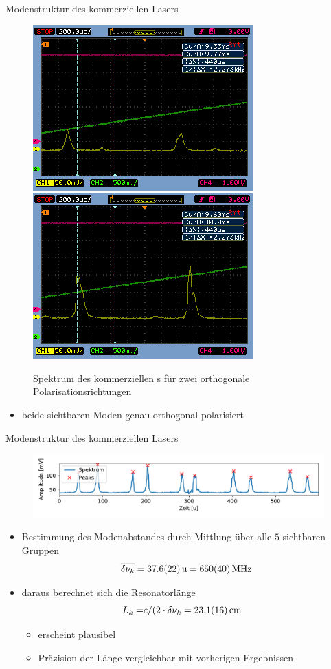 \documentclass[10pt, aspectratio=169]{beamer}
\newcommand{\hne}{\ce{HeNe}}
\begin{document}
\begin{frame}{Modenstruktur des kommerziellen Lasers}
  \begin{figure}[b]\centering
    \includegraphics[width=.3\columnwidth]{pol1.png}
    \includegraphics[width=.3\columnwidth]{pol2.png}
    \caption[Gauss]{Spektrum des kommerziellen \hne{}s f\"ur zwei
      orthogonale Polarisationsrichtungen}
  \end{figure}

  \begin{itemize}
  \item beide sichtbaren Moden genau orthogonal polarisiert
  \end{itemize}
\end{frame}

\begin{frame}{Modenstruktur des kommerziellen Lasers}
  \begin{figure}[b]\centering
    \includegraphics[width=1\columnwidth]{figs/komm_all_peaks.pdf}
  \end{figure}

  \begin{itemize}
  \item<1-> Bestimmung des Modenabstandes durch Mittlung \"uber alle
    \(5\) sichtbaren Gruppen
    \begin{equation}
      \label{eq:modeabstkom}
      \overline{\delta\nu_k}=\SI{37.6\pm 2.2}{u}=\SI{650\pm 40}{\mega\hertz}
    \end{equation}
  \item<2-> daraus berechnet sich die Resonatorlänge
    \begin{align}
      L_k =& c/(2\cdot \delta\nu_k = \SI{23.1\pm 1.6}{\centi\meter}
    \end{align}
    \begin{itemize}
    \item<3-> erscheint plausibel
    \item<3-> Pr\"azision der L\"ange vergleichbar mit vorherigen
      Ergebnissen
    \end{itemize}
  \end{itemize}
\end{frame}
\end{document}
